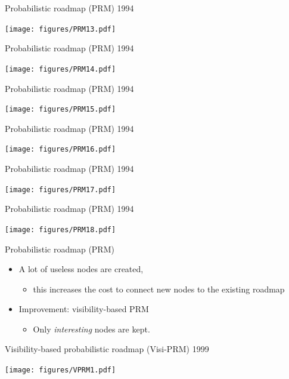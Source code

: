 \begin{frame} {Probabilistic roadmap (PRM) 1994}
\centerline {
  \texttt{[image: figures/PRM13.pdf]}
}
\end{frame}

\begin{frame} {Probabilistic roadmap (PRM) 1994}
\centerline {
  \texttt{[image: figures/PRM14.pdf]}
}
\end{frame}

\begin{frame} {Probabilistic roadmap (PRM) 1994}
\centerline {
  \texttt{[image: figures/PRM15.pdf]}
}
\end{frame}

\begin{frame} {Probabilistic roadmap (PRM) 1994}
\centerline {
  \texttt{[image: figures/PRM16.pdf]}
}
\end{frame}

\begin{frame} {Probabilistic roadmap (PRM) 1994}
\centerline {
  \texttt{[image: figures/PRM17.pdf]}
}
\end{frame}

\begin{frame} {Probabilistic roadmap (PRM) 1994}
\centerline {
  \texttt{[image: figures/PRM18.pdf]}
}
\end{frame}

\begin{frame} {Probabilistic roadmap (PRM)}
  \begin{itemize}
  \item A lot of useless nodes are created,
    \begin{itemize}
    \item this increases the cost to connect new nodes to the existing roadmap
    \end{itemize}
  \item Improvement: visibility-based PRM
    \begin{itemize}
    \item Only \textit{interesting} nodes are kept.
    \end{itemize}
  \end{itemize}
\end{frame}


%
%
\begin{frame} {Visibility-based probabilistic roadmap (Visi-PRM) 1999}
\centerline {
  \texttt{[image: figures/VPRM1.pdf]}
}
\end{frame}

